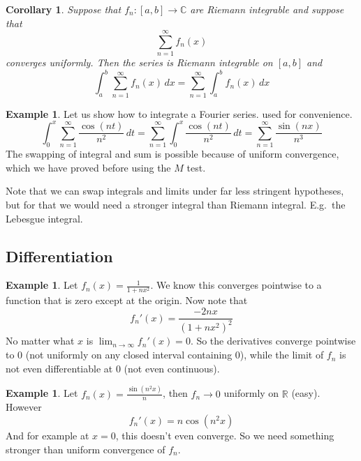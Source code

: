 \documentclass[12pt]{book}
\newcommand{\C}{{\mathbb{C}}}
\newcommand{\R}{{\mathbb{R}}}
\theoremstyle{plain}
\newtheorem{cor}[thm]{Corollary}
\theoremstyle{remark}
\theoremstyle{definition}
\theoremstyle{exercise}
\theoremstyle{example}
\newtheorem{example}[thm]{Example}
\begin{document}
\begin{cor}
Suppose that $f_n \colon [a,b] \to \C$
are Riemann integrable and suppose that
\begin{equation*}
\sum_{n=1}^\infty f_n(x)
\end{equation*}
converges uniformly.  Then the series is Riemann integrable on $[a,b]$
and
\begin{equation*}
\int_a^b \sum_{n=1}^\infty f_n(x) \,dx
=
\sum_{n=1}^\infty \int_a^b f_n(x) \,dx
\end{equation*}
\end{cor}

\begin{example}
Let us show how to integrate a Fourier series.
used for convenience.
\begin{equation*}
\int_{0}^x \sum_{n=1}^\infty \frac{\cos(nt)}{n^2} \,dt
=
\sum_{n=1}^\infty \int_{0}^x \frac{\cos(nt)}{n^2}\,dt
=
\sum_{n=1}^\infty \frac{\sin(nx)}{n^3}
\end{equation*}
The swapping of integral and sum is possible because of uniform convergence,
which we have proved before using the $M$ test.
\end{example}

Note that we can swap integrals and limits under far less stringent hypotheses,
but for that we would need a stronger integral than Riemann integral.  E.g.\
the Lebesgue integral.

\subsection{Differentiation}

\begin{example}
Let $f_n(x) = \frac{1}{1+nx^2}$.  We know this converges
pointwise to a function that is zero except at the origin.
Now note that
\begin{equation*}
f_n'(x) %
= \frac{-2 n x}{(1+ n x^2)^2}
\end{equation*}
No matter what $x$ is $\lim_{n\to\infty} f_n'(x) = 0$.  So the derivatives
converge pointwise to 0 (not uniformly on any closed interval containing 0),
while the limit of $f_n$ is not even differentiable at 0 (not even
continuous).
\end{example}


\begin{example}
Let $f_n(x) = \frac{\sin(n^2x)}{n}$, then
$f_n \to 0$ uniformly on $\R$ (easy).  However
\begin{equation*}
f_n'(x) = n\cos(n^2x)
\end{equation*}
And for example at $x=0$, this doesn't even converge.  So we need something
stronger than uniform convergence of $f_n$.
\end{example}
\end{document}

